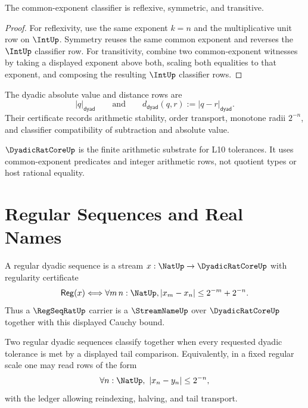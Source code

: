 \begin{theorem}
\label{thm:countable-completion-dyadic-classifier-laws}
The common-exponent classifier is reflexive, symmetric, and transitive.
\end{theorem}

\begin{proof}
For reflexivity, use the same exponent $k=n$ and the multiplicative unit row
on $\IntUp$.  Symmetry reuses the same common exponent and reverses the
$\IntUp$ classifier row.  For transitivity, combine two common-exponent
witnesses by taking a displayed exponent above both, scaling both equalities
to that exponent, and composing the resulting $\IntUp$ classifier rows.
\end{proof}

\begin{definition}
\label{def:countable-completion-dyadic-distance}
The dyadic absolute value and distance rows are
$$
|q|_{\mathsf{dyad}}
\qquad\text{and}\qquad
d_{\mathsf{dyad}}(q,r):=|q-r|_{\mathsf{dyad}}.
$$
Their certificate records arithmetic stability, order transport, monotone
radii $2^{-n}$, and classifier compatibility of subtraction and absolute
value.
\end{definition}

\begin{principle}
\label{prin:countable-completion-dyadic-core-boundary}
$\DyadicRatCoreUp$ is the finite arithmetic substrate for L10 tolerances.  It
uses common-exponent predicates and integer arithmetic rows, not quotient
types or host rational equality.
\end{principle}

\section{Regular Sequences and Real Names}
\label{sec:countable-completion-real-names}

\begin{definition}
\label{def:countable-completion-regular-sequence}
A regular dyadic sequence is a stream
$x:\NatUp\to\DyadicRatCoreUp$ with regularity certificate
$$
\mathsf{Reg}(x)
\Longleftrightarrow
\forall m\,n:\NatUp,
|x_m-x_n|\le 2^{-m}+2^{-n}.
$$
Thus a $\RegSeqRatUp$ carrier is a $\StreamNameUp$ over
$\DyadicRatCoreUp$ together with this displayed Cauchy bound.
\end{definition}

\begin{definition}
\label{def:countable-completion-regseq-classifier}
Two regular dyadic sequences classify together when every requested dyadic
tolerance is met by a displayed tail comparison.  Equivalently, in a fixed
regular scale one may read rows of the form
$$
\forall n:\NatUp,\ |x_n-y_n|\le 2^{-n},
$$
with the ledger allowing reindexing, halving, and tail transport.
\end{definition}

